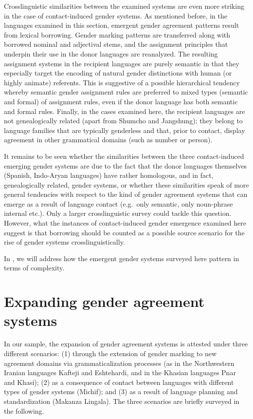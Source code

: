 \documentclass[output=collectionpaper]{langsci/langscibook}
\begin{document}
Crosslinguistic similarities between the examined systems are even more striking in the case of contact-induced gender systems. As mentioned before, in the languages examined in this section, emergent gender agreement patterns result from lexical borrowing. Gender marking patterns are transferred along with borrowed nominal and adjectival stems, and the assignment principles that underpin their use in the donor languages are reanalyzed. The resulting assignment systems in the recipient languages are purely semantic in that they especially target the encoding of natural gender distinctions with human (or highly animate) referents. This is suggestive of a possible hierarchical tendency whereby semantic gender assignment rules are preferred to mixed types (semantic and formal) of assignment rules, even if the donor language has both semantic and formal rules. Finally, in the cases examined here, the recipient languages are not genealogically related (apart from Shumcho and Jangshung); they belong to language families that are typically genderless and that, prior to contact, display agreement in other grammatical domains (such as number or person).

It remains to be seen whether the similarities between the three contact-induced emerging gender systems are due to the fact that the donor languages themselves (Spanish, Indo-Aryan languages) have rather homologous, and in fact, genealogically related, gender systems, or whether these similarities speak of more general tendencies with respect to the kind of gender agreement systems that can emerge as a result of language contact (e.g.\ only semantic, only noun-phrase internal etc.). Only a larger crosslinguistic survey could tackle this question. However, what the instances of contact-induced gender emergence examined here suggest is that borrowing should be counted as a possible source scenario for the rise of gender systems crosslinguistically.


In , we will address how the emergent gender systems surveyed here pattern in terms of complexity.

\section{Expanding gender agreement systems}
\label{subsec:expanding}
In our sample, the expansion of gender agreement systems is attested under three different scenarios: (1) through the extension of gender marking to new agreement domains via grammaticalization processes  (as in the Northwestern Iranian languages Kafteji and Eshtehardi, and in the Khasian languages Pnar and Khasi); (2) as a consequence of contact between languages with different types of gender systems (Michif); and (3) as a result of language planning and standardization (Makanza Lingala). The three scenarios are briefly surveyed in the following.
\end{document}
